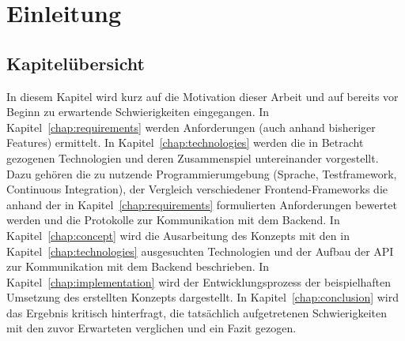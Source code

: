 \chapter{Einleitung}\label{chap:introduction}

\section{Kapitelübersicht}
In diesem Kapitel wird kurz auf die Motivation dieser Arbeit und auf bereits vor Beginn zu erwartende Schwierigkeiten eingegangen.
In Kapitel~\ref{chap:requirements} werden Anforderungen (auch anhand bisheriger Features) ermittelt.
In Kapitel~\ref{chap:technologies} werden die in Betracht gezogenen Technologien und deren Zusammenspiel untereinander vorgestellt. Dazu gehören die zu nutzende Programmierumgebung (Sprache, Testframework, Continuous Integration), der Vergleich verschiedener Frontend-Frameworks die anhand der in Kapitel~\ref{chap:requirements} formulierten Anforderungen bewertet werden und die Protokolle zur Kommunikation mit dem Backend.
In Kapitel~\ref{chap:concept} wird die Ausarbeitung des Konzepts mit den in Kapitel~\ref{chap:technologies} ausgesuchten Technologien und der Aufbau der API zur Kommunikation mit dem Backend beschrieben.
In Kapitel~\ref{chap:implementation} wird der Entwicklungsprozess der beispielhaften Umsetzung des erstellten Konzepts dargestellt.
In Kapitel~\ref{chap:conclusion} wird das Ergebnis kritisch hinterfragt, die tatsächlich aufgetretenen Schwierigkeiten mit den zuvor Erwarteten verglichen und ein Fazit gezogen.

